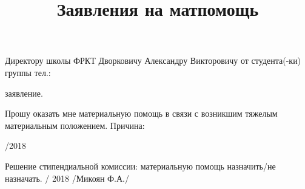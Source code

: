 \documentclass[a4paper, 14pt]{extarticle}
\title{Заявления на матпомощь}
\begin{document}

\begin{adjustwidth}{10 cm}{}
Директору школы ФРКТ \newline
Дворковичу Александру Викторовичу \newline
от студента(-ки) \underline{\hspace{10 mm}} группы \underline{\hspace{10 mm}} \newline
\newline
тел.: \underline{\hspace{50 mm}}
\end{adjustwidth}

\begin{center} 

заявление. 

\end{center} 

Прошу оказать мне материальную помощь в связи с возникшим тяжелым материальным положением. Причина: 

\vspace{16 mm}
\underline{\hspace{7 mm}}
\underline{\hspace{2.5 cm}}/2018 
\hfill  \underline{\hspace{2.5 cm}} \underline{\hspace{2.5 cm}}

\vspace{14 mm}

Решение стипендиальной комиссии: 
материальную помощь назначить/не назначать. 
\vspace{8 mm} 
\underline{\hspace{7 mm}}/\underline{\hspace{2.5 cm}}
2018 \hfill \underline{\hspace{2.5 cm}}/Микоян Ф.А./ 
\vspace{10 mm}
\end{document}
